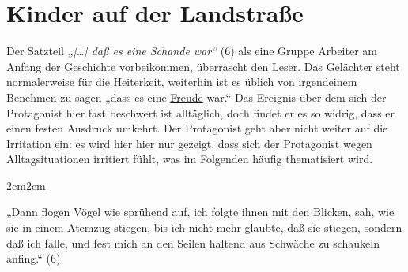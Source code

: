 \documentclass[12pt,a4paper]{article}
\newenvironment{longquote}
{%
    \vspace{-1em}
    \begin{adjustwidth}{2cm}{2cm}
        \singlespacing
        \fontsize{10}{12}\selectfont
    }
{%
    \end{adjustwidth}
}
\begin{document}
\section{Kinder auf der Landstraße}
%
Der Satzteil \textit{„[…] daß es eine Schande war“} (6) als eine Gruppe Arbeiter am Anfang der Geschichte vorbeikommen, überrascht den Leser. Das Gelächter steht normalerweise für die Heiterkeit, weiterhin ist es üblich von irgendeinem Benehmen zu sagen „dass es eine \uline{Freude} war.“ Das Ereignis über dem sich der Protagonist hier fast beschwert ist alltäglich, doch findet er es so widrig, dass er einen festen Ausdruck umkehrt. Der Protagonist geht aber nicht weiter auf die Irritation ein: es wird hier hier nur gezeigt, dass sich der Protagonist wegen Alltagsituationen irritiert fühlt, was im Folgenden häufig thematisiert wird. \par
%
\begin{longquote}
    „Dann flogen Vögel wie sprühend auf, ich folgte ihnen mit den Blicken, sah, wie sie in einem Atemzug stiegen, bis ich nicht mehr glaubte, daß sie stiegen, sondern daß ich falle, und fest mich an den Seilen haltend aus Schwäche zu schaukeln anfing.“ (6)
\end{longquote}
\end{document}
